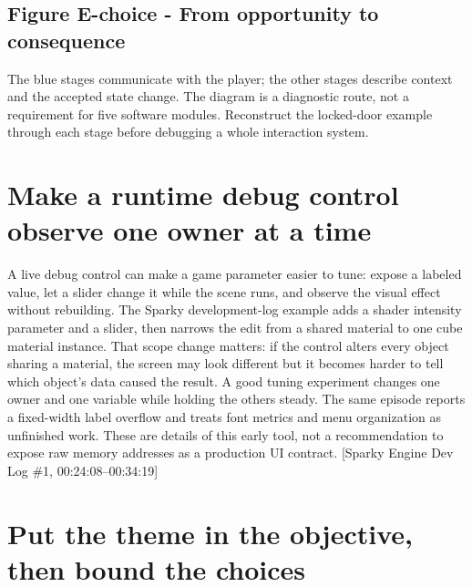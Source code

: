 \subsection{Figure E-choice - From opportunity to consequence}\label{06-engine-ii-ch047-figure-e-choice---from-opportunity-to-consequence}

\hypertarget{06-engine-ii-ch047-figure-e-choice---from-opportunity-to-consequence}{}


The blue stages communicate with the player; the other stages describe context and the accepted state change. The diagram is a diagnostic route, not a requirement for five software modules. Reconstruct the locked-door example through each stage before debugging a whole interaction system.

\section{Make a runtime debug control observe one owner at a time}\label{06-engine-ii-ch047-make-a-runtime-debug-control-observe-one-owner-at-a-time}

\hypertarget{06-engine-ii-ch047-make-a-runtime-debug-control-observe-one-owner-at-a-time}{}

A live debug control can make a game parameter easier to tune: expose a labeled value, let a slider change it while the scene runs, and observe the visual effect without rebuilding. The Sparky development-log example adds a shader intensity parameter and a slider, then narrows the edit from a shared material to one cube material instance. That scope change matters: if the control alters every object sharing a material, the screen may look different but it becomes harder to tell which object's data caused the result. A good tuning experiment changes one owner and one variable while holding the others steady. The same episode reports a fixed-width label overflow and treats font metrics and menu organization as unfinished work. These are details of this early tool, not a recommendation to expose raw memory addresses as a production UI contract. {[}Sparky Engine Dev Log \#1, 00:24:08--00:34:19{]}

\section{Put the theme in the objective, then bound the choices}\label{06-engine-ii-ch047-put-the-theme-in-the-objective-then-bound-the-choices}

